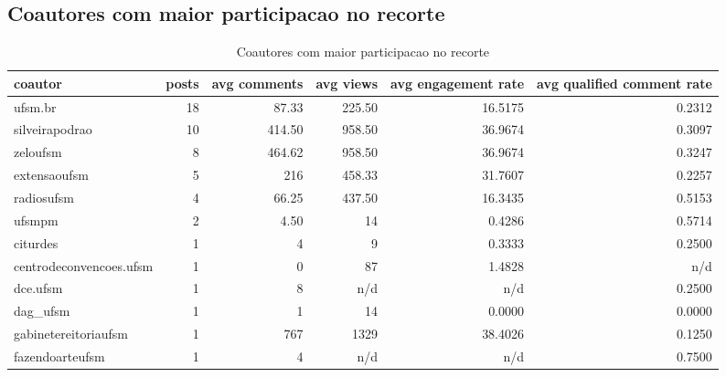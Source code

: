 \documentclass[12pt,a4paper]{article}
\begin{document}
\subsection{Coautores com maior participacao no recorte}
\begin{table}[H]
\centering
\scriptsize
\begin{adjustbox}{max width=\textwidth}
\begin{tabular}{l r r r r r}
\toprule
coautor & posts & avg comments & avg views & avg engagement rate & avg qualified comment rate \\
\midrule
ufsm.br & 18 & 87.33 & 225.50 & 16.5175 & 0.2312 \\
silveirapodrao & 10 & 414.50 & 958.50 & 36.9674 & 0.3097 \\
zeloufsm & 8 & 464.62 & 958.50 & 36.9674 & 0.3247 \\
extensaoufsm & 5 & 216 & 458.33 & 31.7607 & 0.2257 \\
radiosufsm & 4 & 66.25 & 437.50 & 16.3435 & 0.5153 \\
ufsmpm & 2 & 4.50 & 14 & 0.4286 & 0.5714 \\
citurdes & 1 & 4 & 9 & 0.3333 & 0.2500 \\
centrodeconvencoes.ufsm & 1 & 0 & 87 & 1.4828 & n/d \\
dce.ufsm & 1 & 8 & n/d & n/d & 0.2500 \\
dag\_ufsm & 1 & 1 & 14 & 0.0000 & 0.0000 \\
gabinetereitoriaufsm & 1 & 767 & 1329 & 38.4026 & 0.1250 \\
fazendoarteufsm & 1 & 4 & n/d & n/d & 0.7500 \\
\bottomrule
\end{tabular}
\end{adjustbox}
\caption{Coautores com maior participacao no recorte}
\label{tab:coautores}
\end{table}
\end{document}
